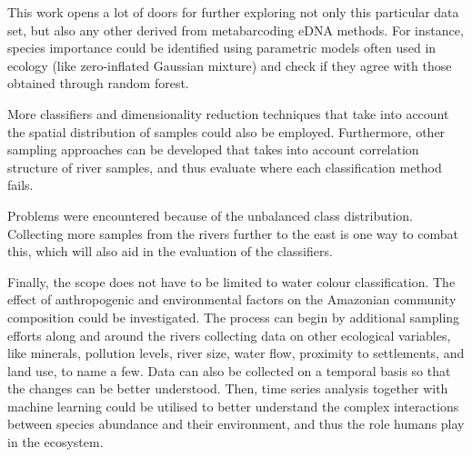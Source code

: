 This work opens a lot of doors for further exploring not only this particular data set, but also any other derived from metabarcoding eDNA methods.
For instance, species importance could be identified using parametric models often used in ecology (like zero-inflated Gaussian mixture) and check if they agree with those obtained through random forest. 

 More classifiers and dimensionality reduction techniques that take into account the spatial distribution of samples could also be employed. Furthermore, other sampling approaches can be developed that takes into account correlation structure of river samples, and thus evaluate where each classification method fails.
 
 Problems were encountered because of the unbalanced class distribution. Collecting more samples from the rivers further to the east is one way to combat this, which will also aid in the evaluation of the classifiers.
 
 
 Finally, the scope does not have to be limited to water colour classification. The effect of anthropogenic and environmental factors on the Amazonian community composition could be investigated. The process can begin by additional sampling efforts along and around the rivers collecting data on other ecological variables, like minerals, pollution levels, river size, water flow, proximity to settlements, and land use, to name a few. Data can also be collected on a temporal basis so that the changes can be better understood. Then, time series analysis together with machine learning could be utilised to better understand the complex interactions between species abundance and their environment, and thus the role humans play in the ecosystem.

